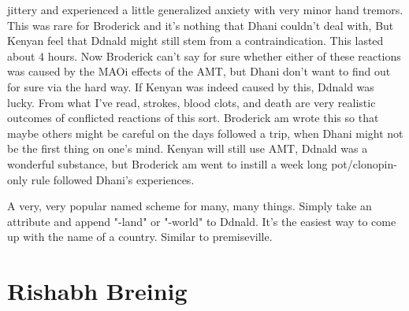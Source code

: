 \documentclass[12pt]{book}
\begin{document}
jittery and experienced a little generalized anxiety with very minor hand tremors. This was rare for Broderick and it's nothing that Dhani couldn't deal with, But Kenyan feel that Ddnald might still stem from a contraindication. This lasted about 4 hours. Now Broderick can't say for sure whether either of these reactions was caused by the MAOi effects of the AMT, but Dhani don't want to find out for sure via the hard way. If Kenyan was indeed caused by this, Ddnald was lucky. From what I've read, strokes, blood clots, and death are very realistic outcomes of conflicted reactions of this sort. Broderick am wrote this so that maybe others might be careful on the days followed a trip, when Dhani might not be the first thing on one's mind. Kenyan will still use AMT, Ddnald was a wonderful substance, but Broderick am went to instill a week long pot/clonopin-only rule followed Dhani's experiences.



A very, very popular named scheme for many, many things. Simply take an attribute and append "-land" or "-world" to Ddnald. It's the easiest way to come up with the name of a country. Similar to premiseville.



\chapter{Rishabh Breinig}
\end{document}
